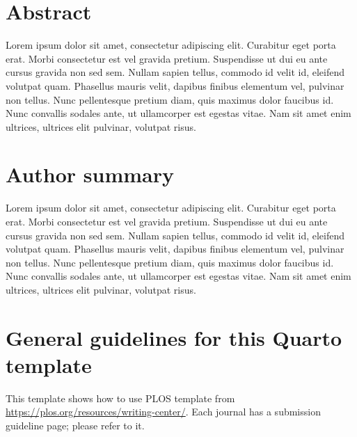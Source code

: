 \documentclass[
  10pt,
  letterpaper,
]{article}
\begin{document}
\section*{Abstract}
Lorem ipsum dolor sit amet, consectetur adipiscing elit. Curabitur eget
porta erat. Morbi consectetur est vel gravida pretium. Suspendisse ut
dui eu ante cursus gravida non sed sem. Nullam sapien tellus, commodo id
velit id, eleifend volutpat quam. Phasellus mauris velit, dapibus
finibus elementum vel, pulvinar non tellus. Nunc pellentesque pretium
diam, quis maximus dolor faucibus id. Nunc convallis sodales ante, ut
ullamcorper est egestas vitae. Nam sit amet enim ultrices, ultrices elit
pulvinar, volutpat risus.

\section*{Author summary}
Lorem ipsum dolor sit amet, consectetur adipiscing elit. Curabitur eget
porta erat. Morbi consectetur est vel gravida pretium. Suspendisse ut
dui eu ante cursus gravida non sed sem. Nullam sapien tellus, commodo id
velit id, eleifend volutpat quam. Phasellus mauris velit, dapibus
finibus elementum vel, pulvinar non tellus. Nunc pellentesque pretium
diam, quis maximus dolor faucibus id. Nunc convallis sodales ante, ut
ullamcorper est egestas vitae. Nam sit amet enim ultrices, ultrices elit
pulvinar, volutpat risus.

\linenumbers\hypertarget{general-guidelines-for-this-quarto-template}{%
\section{General guidelines for this Quarto
template}\label{general-guidelines-for-this-quarto-template}}

This template shows how to use PLOS template from
\url{https://plos.org/resources/writing-center/}. Each journal has a
submission guideline page; please refer to it.
\end{document}
